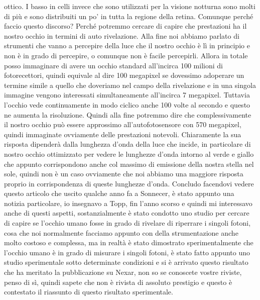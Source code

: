 {ottico. I basso in celli invece che sono utilizzati per la visione notturna sono molti di più e sono distribuiti un po' in tutta la regione della retina. Comunque perché faccio questo discorso? Perché potremmo cercare di capire che prestazioni ha il nostro occhio in termini di auto rivelazione. Alla fine noi abbiamo parlato di strumenti che vanno a percepire della luce che il nostro occhio è lì in principio e non è in grado di percepire, o comunque non è facile percepirli. Allora in totale posso immaginare di avere un occhio standard all'incirca 100 milioni di fotorecettori, quindi equivale al dire 100 megapixel se dovessimo adoperare un termine simile a quello che doveriamo nel campo della rivelazione e in una singola immagine vengono interessati simultaneamente all'incirca 7 megapixel. Tuttavia l'occhio vede continuamente in modo ciclico anche 100 volte al secondo e questo ne aumenta la risoluzione. Quindi alla fine potremmo dire che complessivamente il nostro occhio può essere approssimo all'autofotosensore con 570 megapixel, quindi immaginate ovviamente delle prestazioni notevoli. Chiaramente la sua risposta dipenderà dalla lunghezza d'onda della luce che incide, in particolare di nostro occhio ottimizzato per vedere le lunghezze d'onda intorno al verde e giallo che appunto corrispondono anche col massimo di emissione della nostra stella nel sole, quindi non è un caso ovviamente che noi abbiamo una maggiore risposta proprio in corrispondenza di queste lunghezze d'onda. Concludo facendovi vedere questo articolo che uscito qualche anno fa a Sonnecer, è stato appunto una notizia particolare, io insegnavo a Topp, fin l'anno scorso e quindi mi interessavo anche di questi aspetti, sostanzialmente è stato condotto uno studio per cercare di capire se l'occhio umano fosse in grado di rivelare di riperrare i singoli fotoni, cosa che noi normalmente facciamo appunto con della strumentazione anche molto costoso e complessa, ma in realtà è stato dimostrato sperimentalmente che l'occhio umano è in grado di misurare i singoli fotoni, è stato fatto appunto uno studio sperimentale sotto determinate condizioni e si è arrivato questo risultato che ha meritato la pubblicazione su Nexar, non so se conoscete vostre riviste, penso di sì, quindi sapete che non è rivista di assoluto prestigio e questo è contestato il riassunto di questo risultato sperimentale.
}